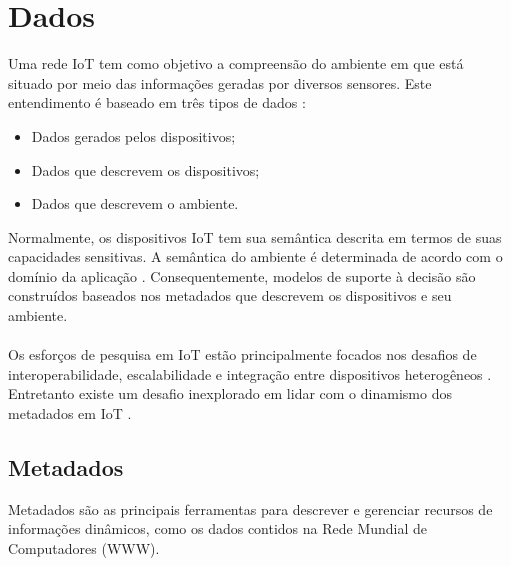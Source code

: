 \section{Dados}%
\label{sec:dados}
	\quad Uma rede \acrlong{IoT} tem como objetivo a compreensão do ambiente em que está situado por meio das informações geradas por diversos
  sensores. Este entendimento é baseado em três tipos de dados \cite{SemIOT}:
  \begin{itemize}
    \item Dados gerados pelos dispositivos;
    \item Dados que descrevem os dispositivos;
    \item Dados que descrevem o ambiente.
  \end{itemize}
  \quad Normalmente, os dispositivos \acrshort{IoT} tem sua semântica descrita em termos de suas capacidades sensitivas. A semântica do ambiente
  é determinada de acordo com o domínio da aplicação \cite{IOTdata}. Consequentemente, modelos de suporte à decisão são construídos
  baseados nos metadados que descrevem os dispositivos e seu ambiente.
  \\\\ \null
  \quad
  Os esforços de pesquisa em \acrlong{IoT} estão principalmente focados nos desafios de interoperabilidade, escalabilidade e integração entre dispositivos heterogêneos \cite{IOTdata}.
  Entretanto existe um desafio inexplorado em lidar com o dinamismo dos metadados em \acrshort{IoT} \cite{collaborative}.

	\subsection{Metadados}
  \quad Metadados são as principais ferramentas para descrever e gerenciar recursos de informações  dinâmicos, como os dados
  contidos na Rede Mundial de Computadores (WWW).
